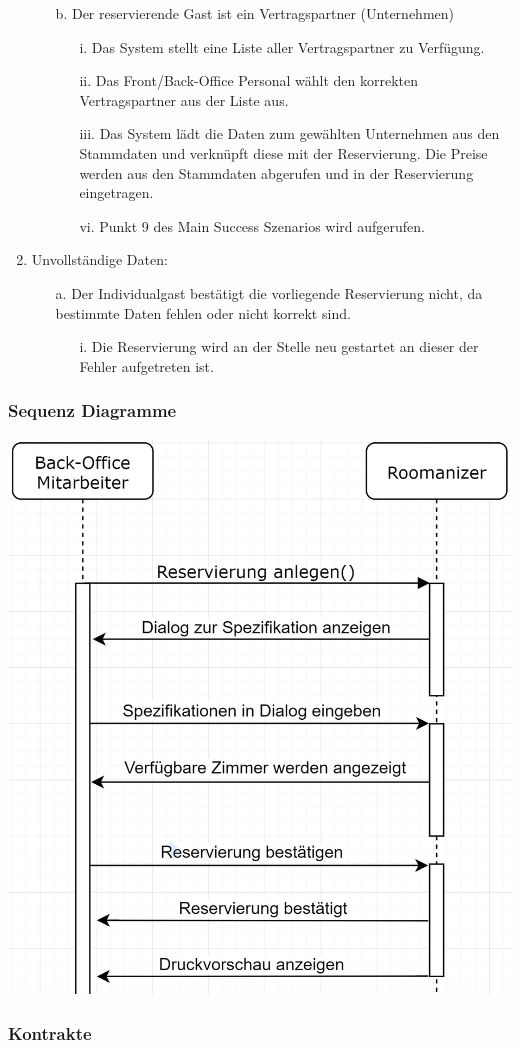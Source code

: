 \documentclass[./detailed_overview_usecases.tex]{subfiles}
\begin{document}
\begin{enumerate}
\begin{itemize}
            \item[b.] Der reservierende Gast ist ein Vertragspartner (Unternehmen)
                \begin{itemize}
                    \item[i.] Das System stellt eine Liste aller Vertragspartner zu Verfügung.
                    \item[ii.] Das Front/Back-Office Personal wählt den korrekten Vertragspartner aus der Liste aus.
                    \item[iii.] Das System lädt die Daten zum gewählten Unternehmen aus den Stammdaten und verknüpft diese mit der Reservierung. Die Preise
                    werden aus den Stammdaten abgerufen und in der Reservierung eingetragen.
                    \item[vi.] Punkt 9 des Main Success Szenarios wird aufgerufen.
                \end{itemize}
        \end{itemize}
        \setcounter{enumi}{8}
        \item Unvollständige Daten: \begin{itemize}
                                        \item[a.] Der Individualgast bestätigt die vorliegende Reservierung nicht, da bestimmte Daten fehlen oder nicht korrekt sind.
                                        \begin{itemize}
                                            \item[i.] Die Reservierung wird an der Stelle neu gestartet an dieser der Fehler aufgetreten ist.
                                        \end{itemize}
                                    \end{itemize}
    \end{enumerate}

    \subsubsection{Sequenz Diagramme}
    \centering
        \includegraphics[width=0.7\linewidth]{./content/usecases/UseCase_ReservierungIndividualgastSequenze.JPG}
    \subsubsection{Kontrakte}
\end{document}
